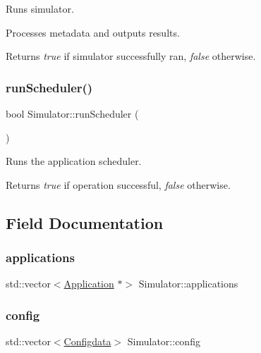 Runs simulator. 

Processes metadata and outputs results.

\begin{DoxyReturn}{Returns}
{\itshape true} if simulator successfully ran, {\itshape false} otherwise. 
\end{DoxyReturn}
\hypertarget{class_simulator_a71f3f54a1da19c9434f6f6811727691d}{}\label{class_simulator_a71f3f54a1da19c9434f6f6811727691d} 
\subsubsection{\texorpdfstring{run\+Scheduler()}{runScheduler()}}
{\footnotesize\ttfamily bool Simulator\+::run\+Scheduler (\begin{DoxyParamCaption}{ }\end{DoxyParamCaption})\hspace{0.3cm}{\ttfamily [private]}}



Runs the application scheduler. 

\begin{DoxyReturn}{Returns}
{\itshape true} if operation successful, {\itshape false} otherwise. 
\end{DoxyReturn}


\subsection{Field Documentation}
\hypertarget{class_simulator_adcc7cd2ee35795c8fa75a4e8c596b8bc}{}\label{class_simulator_adcc7cd2ee35795c8fa75a4e8c596b8bc} 
\subsubsection{\texorpdfstring{applications}{applications}}
{\footnotesize\ttfamily std\+::vector$<$\hyperlink{class_application}{Application} $\ast$$>$ Simulator\+::applications\hspace{0.3cm}{\ttfamily [private]}}

\hypertarget{class_simulator_a0652336abca9dfc9a4e7abfa898fd639}{}\label{class_simulator_a0652336abca9dfc9a4e7abfa898fd639} 
\subsubsection{\texorpdfstring{config}{config}}
{\footnotesize\ttfamily std\+::vector$<$\hyperlink{struct_configdata}{Configdata}$>$ Simulator\+::config\hspace{0.3cm}{\ttfamily [private]}}

